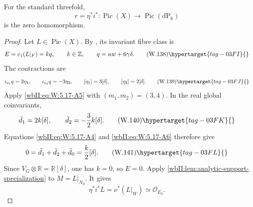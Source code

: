\begin{theorem}
\hypertarget{tag-03IW}{}\label{wbII:thm:analytic-all-picard}

For the standard threefold,
\[
 r=\eta^*i^*:\operatorname{Pic}(X)\longrightarrow
 \operatorname{Pic}(\mathrm{dP}_6)
\]
is the zero homomorphism.
\end{theorem}



\begin{proof}
Let \(L\in\operatorname{Pic}(X)\).  By
\cite[Proposition~7.26, pp.~61--62]{AC2026}, its invariant fibre class is
\[
 E=c_1(L|_F)=kq,
 \qquad k\in\mathbb Z,
 \qquad q=uw+6\gamma\delta.
\tag{W.138}\hypertarget{tag-03FI}{}\label{wbII:eq:W:5.17-A35}
\]
The contractions are
\[
 \iota_{v_1}q=2\eta_1,
 \qquad
 \iota_{v_2}q=-3\eta_2,
 \qquad
 [\eta_1]=3[\delta],
 \qquad
 [\eta_2]=2[\delta].
\tag{W.139}\hypertarget{tag-03FJ}{}\label{wbII:eq:W:5.17-A36}
\]
Apply \eqref{wbII:eq:W:5.17-A5} with \((m_1,m_2)=(3,4)\).  In the real global
coinvariants,
\[
 \bar d_1=2k[\delta],
 \qquad
 \bar d_2=-\frac32k[\delta].
\tag{W.140}\hypertarget{tag-03FK}{}\label{wbII:eq:W:5.17-A37}
\]
Equations \eqref{wbII:eq:W:5.17-A4} and \eqref{wbII:eq:W:5.17-A6} therefore give
\[
 0=\bar d_1+\bar d_2+\bar d_0
   =\frac{k}{2}[\delta].
\tag{W.141}\hypertarget{tag-03FL}{}\label{wbII:eq:W:5.17-A38}
\]
Since \(V_G\otimes\mathbb R=\mathbb R[\delta]\), one has \(k=0\), so
\(E=0\).  Apply \cref{wbII:lem:analytic-support-specialization} to
\(M=L|_{N_0}\).  It gives
\[
 \eta^*i^*L=\nu^*(L|_W)\simeq\mathcal O_{E_0}.
\]

\end{proof}
